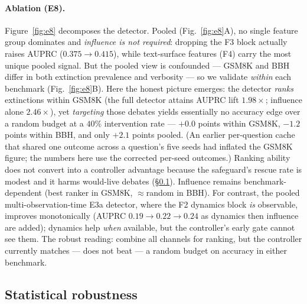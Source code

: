 \paragraph{Ablation (E8).}
Figure~\ref{fig:e8} decomposes the detector. Pooled (Fig.~\ref{fig:e8}A), no single
feature group dominates and \emph{influence is not required}: dropping the F3 block
actually raises AUPRC ($0.375\!\to\!0.415$), while text-surface features (F4) carry the
most unique pooled signal. But the pooled view is confounded --- GSM8K and BBH differ in
both extinction prevalence and verbosity --- so we validate \emph{within} each benchmark
(Fig.~\ref{fig:e8}B). Here the honest picture emerges: the detector \emph{ranks}
extinctions within GSM8K (the full detector attains AUPRC lift $1.98\times$; influence
alone $2.46\times$), yet \emph{targeting} those debates yields essentially no accuracy
edge over a random budget at a $40\%$ intervention rate --- $+0.0$ points within GSM8K,
$-1.2$ points within BBH, and only $+2.1$ points pooled. (An earlier per-question cache
that shared one outcome across a question's five seeds had inflated the GSM8K figure;
the numbers here use the corrected per-seed outcomes.) Ranking ability does not convert
into a controller advantage because the safeguard's rescue rate is modest and it harms
would-live debates (\S\ref{sec:rq9}). Influence remains benchmark-dependent (best ranker
in GSM8K, $\approx$random in BBH). For contrast, the pooled multi-observation-time E3a
detector, where the F2 dynamics block \emph{is} observable, improves monotonically
(AUPRC $0.19\!\to\!0.22\!\to\!0.24$ as dynamics then influence are added); dynamics help
\emph{when} available, but the controller's early gate cannot see them. The robust
reading: combine all channels for ranking, but the controller currently matches --- does
not beat --- a random budget on accuracy in either benchmark.

\subsection{Statistical robustness}
\label{sec:rq9}

